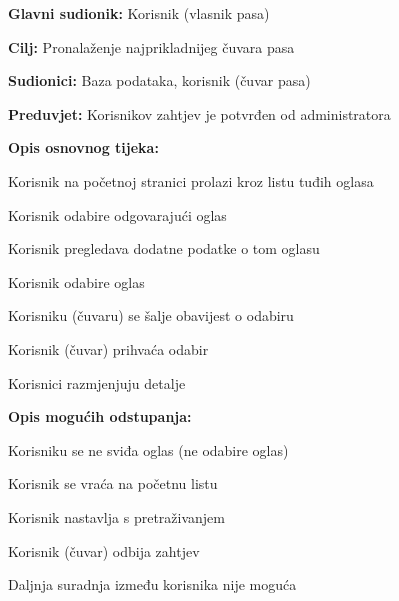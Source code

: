 					\noindent {}
					\begin{packed_item}
						
						\item \textbf{Glavni sudionik: } Korisnik (vlasnik pasa)
						\item  \textbf{Cilj:} Pronalaženje najprikladnijeg čuvara pasa
						\item  \textbf{Sudionici:} Baza podataka, korisnik (čuvar pasa)
						\item  \textbf{Preduvjet:} Korisnikov zahtjev je potvrđen od administratora
						\item  \textbf{Opis osnovnog tijeka:}
						
						\item[] \begin{packed_enum}
							
							\item Korisnik na početnoj stranici prolazi kroz listu tuđih oglasa   
							\item Korisnik odabire odgovarajući oglas
							\item Korisnik pregledava dodatne podatke o tom oglasu
							\item Korisnik odabire oglas 
							\item Korisniku (čuvaru) se šalje obavijest o odabiru
							\item Korisnik (čuvar) prihvaća odabir
							\item Korisnici razmjenjuju detalje
							
						\end{packed_enum}
						
						\item  \textbf{Opis mogućih odstupanja:}
						
						\item[] \begin{packed_item}
							
							\item[4.a] Korisniku se ne sviđa oglas (ne odabire oglas)
							\item[] \begin{packed_enum}
								
								\item Korisnik se vraća na početnu listu
								\item Korisnik nastavlja s pretraživanjem
								
							\end{packed_enum}
						
							\item[6.a] Korisnik (čuvar) odbija zahtjev 
							\item[] \begin{packed_enum}
								
								\item Daljnja suradnja između korisnika nije moguća
								
							\end{packed_enum}
						\end{packed_item}
					\end{packed_item}	

